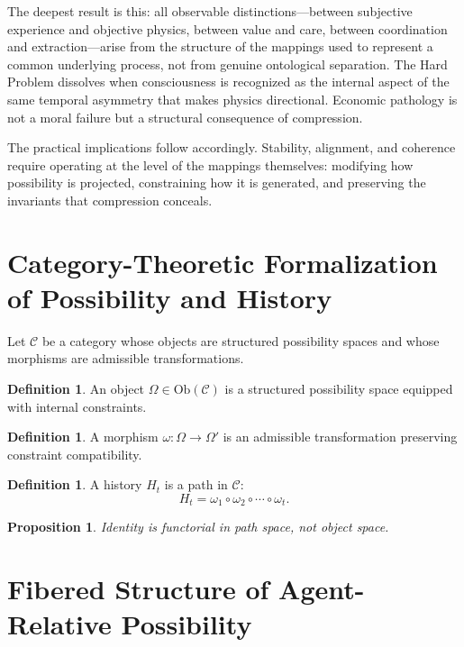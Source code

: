 \documentclass[11pt,a4paper]{article}
\newtheorem{proposition}[theorem]{Proposition}
\theoremstyle{definition}
\newtheorem{definition}[theorem]{Definition}
\theoremstyle{remark}
\begin{document}
The deepest result is this: all observable distinctions---between subjective experience and objective physics, between value and care, between coordination and extraction---arise from the structure of the mappings used to represent a common underlying process, not from genuine ontological separation. The Hard Problem dissolves when consciousness is recognized as the internal aspect of the same temporal asymmetry that makes physics directional. Economic pathology is not a moral failure but a structural consequence of compression.

The practical implications follow accordingly. Stability, alignment, and coherence require operating at the level of the mappings themselves: modifying how possibility is projected, constraining how it is generated, and preserving the invariants that compression conceals.

\appendix

\section{Category-Theoretic Formalization of Possibility and History}

Let $\mathcal{C}$ be a category whose objects are structured possibility spaces and whose morphisms are admissible transformations.

\begin{definition}
An object $\Omega \in \mathrm{Ob}(\mathcal{C})$ is a structured possibility space equipped with internal constraints.
\end{definition}

\begin{definition}
A morphism $\omega : \Omega \to \Omega'$ is an admissible transformation preserving constraint compatibility.
\end{definition}

\begin{definition}
A history $H_t$ is a path in $\mathcal{C}$:
\[
H_t = \omega_1 \circ \omega_2 \circ \cdots \circ \omega_t.
\]
\end{definition}

\begin{proposition}
Identity is functorial in path space, not object space.
\end{proposition}

\section{Fibered Structure of Agent-Relative Possibility}
\end{document}
